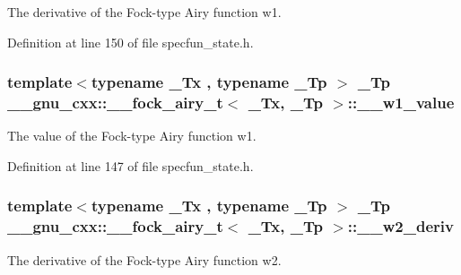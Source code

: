 The derivative of the Fock-\/type Airy function w1. 



Definition at line 150 of file specfun\+\_\+state.\+h.

\subsubsection[{\texorpdfstring{\+\_\+\+\_\+w1\+\_\+value}{__w1_value}}]{\setlength{\rightskip}{0pt plus 5cm}template$<$typename \+\_\+\+Tx , typename \+\_\+\+Tp $>$ \+\_\+\+Tp {\bf \+\_\+\+\_\+gnu\+\_\+cxx\+::\+\_\+\+\_\+fock\+\_\+airy\+\_\+t}$<$ \+\_\+\+Tx, \+\_\+\+Tp $>$\+::\+\_\+\+\_\+w1\+\_\+value}\hypertarget{struct____gnu__cxx_1_1____fock__airy__t_a26faefea72b5ae8bb06578a9f7eaa66d}{}\label{struct____gnu__cxx_1_1____fock__airy__t_a26faefea72b5ae8bb06578a9f7eaa66d}


The value of the Fock-\/type Airy function w1. 



Definition at line 147 of file specfun\+\_\+state.\+h.

\subsubsection[{\texorpdfstring{\+\_\+\+\_\+w2\+\_\+deriv}{__w2_deriv}}]{\setlength{\rightskip}{0pt plus 5cm}template$<$typename \+\_\+\+Tx , typename \+\_\+\+Tp $>$ \+\_\+\+Tp {\bf \+\_\+\+\_\+gnu\+\_\+cxx\+::\+\_\+\+\_\+fock\+\_\+airy\+\_\+t}$<$ \+\_\+\+Tx, \+\_\+\+Tp $>$\+::\+\_\+\+\_\+w2\+\_\+deriv}\hypertarget{struct____gnu__cxx_1_1____fock__airy__t_abcd255990d6386453d48c5fbef224e26}{}\label{struct____gnu__cxx_1_1____fock__airy__t_abcd255990d6386453d48c5fbef224e26}


The derivative of the Fock-\/type Airy function w2. 



